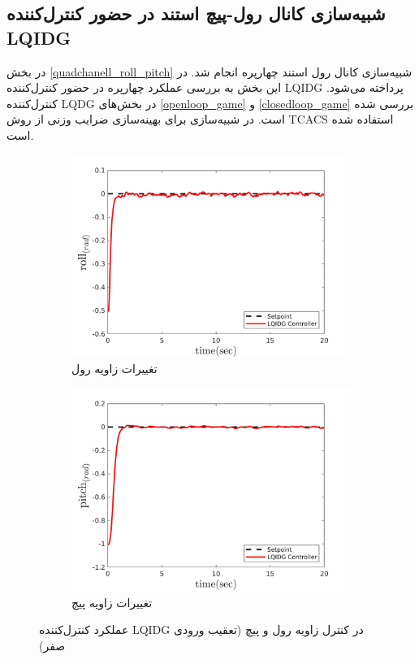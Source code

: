 \subsection{شبیه‌سازی کانال رول-پیچ استند در حضور کنترل‌کننده LQIDG}
در بخش
\ref{quadchanell_roll_pitch}
شبیه‌سازی کانال رول استند چهارپره انجام شد. در این بخش به بررسی عملکرد چهارپره در حضور کنترل‌کننده LQIDG پرداخته می‌شود. کنترل‌کننده LQDG در بخش‌های
\ref{openloop_game}
و
\ref{closedloop_game}
بررسی شده است.
 در شبیه‌سازی برای بهینه‌سازی ضرایب وزنی از روش
TCACS \cite{Karimi2010}
استفاده شده است.
\begin{figure}[H]
	\centering
	\begin{subfigure}
		\centering
		\includegraphics[width=12cm]{../Figures/MIL/LQIDG/Roll_Pitch/lqidg_roll.png}
		\caption{تغییرات زاویه رول}
	\end{subfigure}%
	\begin{subfigure}
		\centering
		\includegraphics[width=12cm]{../Figures/MIL/LQIDG/Roll_Pitch/lqidg_pitch.png}
		\caption{تغییرات زاویه پیچ}
	\end{subfigure}
	\caption{‫‪عملکرد کنترل‌کننده LQIDG در کنترل زاویه رول و پیچ (تعقیب ورودی صفر)}
\end{figure}


